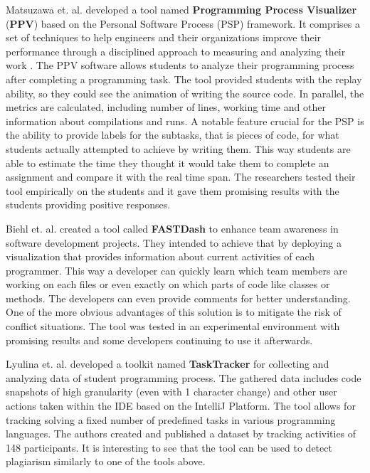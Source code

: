 Matsuzawa et. al. \cite{Mat13PPV} developed a tool named \textbf{Programming Process Visualizer} (\textbf{PPV}) based on the Personal Software Process (PSP) framework. It comprises a set of techniques to help engineers and their organizations improve their performance through a disciplined approach to measuring and analyzing their work \cite{Hum96PSS}. The PPV software allows students to analyze their programming process after completing a programming task. The tool provided students with the replay ability, so they could see the animation of writing the source code. In parallel, the metrics are calculated, including number of lines, working time and other information about compilations and runs. A notable feature crucial for the PSP is the ability to provide labels for the subtasks, that is pieces of code, for what students actually attempted to achieve by writing them. This way students are able to estimate the time they thought it would take them to complete an assignment and compare it with the real time span. The researchers tested their tool empirically on the students and it gave them promising results with the students providing positive responses.

Biehl et. al. \cite{Bie07FASTDash} created a tool called \textbf{FASTDash} to enhance team awareness in software development projects. They intended to achieve that by deploying a visualization that provides information about current activities of each programmer. This way a developer can quickly learn which team members are working on each files or even exactly on which parts of code like classes or methods. The developers can even provide comments for better understanding. One of the more obvious advantages of this solution is to mitigate the risk of conflict situations. The tool was tested in an experimental environment with promising results and some developers continuing to use it afterwards.

Lyulina et. al. \cite{Lyu21TaskTracker} developed a toolkit named \textbf{TaskTracker} for collecting and analyzing data of student programming process. The gathered data includes code snapshots of high granularity (even with 1 character change) and other user actions taken within the IDE based on the IntelliJ Platform. The tool allows for tracking solving a fixed number of predefined tasks in various programming languages. The authors created and published a dataset by tracking activities of 148 participants. It is interesting to see that the tool can be used to detect plagiarism similarly to one of the tools above.

